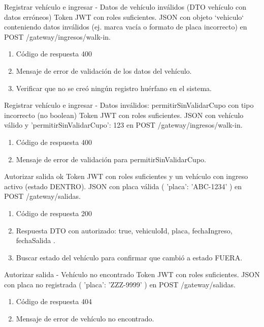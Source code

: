 {Registrar vehículo e ingresar - Datos de vehículo inválidos (DTO vehículo con datos erróneos)}
{Token JWT con roles suficientes.}
{JSON con objeto `vehiculo` conteniendo datos inválidos (ej. marca vacía o formato de placa incorrecto) en POST /gateway/ingresos/walk-in.}
{\begin{enumerate} [leftmargin=*, nosep]
    \item Código de respuesta 400
    \item Mensaje de error de validación de los datos del vehículo.
    \item Verificar que no se creó ningún registro huérfano en el sistema.
\end{enumerate}}

{Registrar vehículo e ingresar - Datos inválidos: permitirSinValidarCupo con tipo incorrecto (no boolean)}
{Token JWT con roles suficientes.}
{JSON con vehículo válido y { 'permitirSinValidarCupo': 123 } en POST /gateway/ingresos/walk-in.}
{\begin{enumerate} [leftmargin=*, nosep]
    \item Código de respuesta 400
    \item Mensaje de error de validación para permitirSinValidarCupo.
\end{enumerate}}

{Autorizar salida ok}
{Token JWT con roles suficientes y un vehículo con ingreso activo (estado DENTRO).}
{JSON con placa válida ({ 'placa': 'ABC-1234' }) en POST /gateway/salidas.}
{\begin{enumerate} [leftmargin=*, nosep]
    \item Código de respuesta 200
    \item Respuesta DTO con { autorizado: true, vehiculoId, placa, fechaIngreso, fechaSalida }.
    \item Buscar estado del vehículo para confirmar que cambió a estado FUERA.
\end{enumerate}}

{Autorizar salida - Vehículo no encontrado}
{Token JWT con roles suficientes.}
{JSON con placa no registrada ({ 'placa': 'ZZZ-9999' }) en POST /gateway/salidas.}
{\begin{enumerate} [leftmargin=*, nosep]
    \item Código de respuesta 404
    \item Mensaje de error de vehículo no encontrado.
\end{enumerate}}

